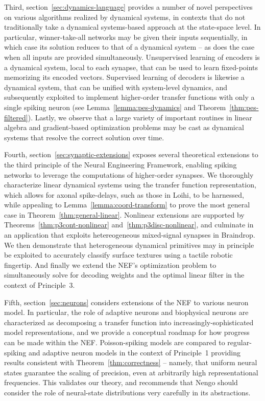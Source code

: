 Third, section~\ref{sec:dynamics-language} provides a number of novel perspectives on various algorithms realized by dynamical systems, in contexts that do not traditionally take a dynamical systems-based approach at the state-space level.
In particular, winner-take-all networks may be given their inputs sequentially, in which case its solution reduces to that of a dynamical system -- as does the case when all inputs are provided simultaneously.
Unsupervised learning of encoders is a dynamical system, local to each synapse, that can be used to learn fixed-points memorizing its encoded vectors. 
Supervised learning of decoders is likewise a dynamical system, that can be unified with system-level dynamics, and subsequently exploited to implement higher-order transfer functions with only a single spiking neuron (see Lemma~\ref{lemma:pes-dynamics} and Theorem~\ref{thm:pes-filtered}).
Lastly, we observe that a large variety of important routines in linear algebra and gradient-based optimization problems may be cast as dynamical systems that resolve the correct solution over time.

Fourth, section~\ref{sec:synaptic-extensions} exposes several theoretical extensions to the third principle of the Neural Engineering Framework, enabling spiking networks to leverage the computations of higher-order synapses.
We thoroughly characterize linear dynamical systems using the transfer function representation, which allows for axonal spike-delays, such as those in Loihi, to be harnessed, while appealing to Lemma~\ref{lemma:coord-transform} to prove the most general case in Theorem~\ref{thm:general-linear}.
Nonlinear extensions are supported by Theorems~\ref{thm:p3cont-nonlinear} and~\ref{thm:p3disc-nonlinear}, and culminate in an application that exploits hetereogeneous mixed-signal synapses in Braindrop.
We then demonstrate that heterogeneous dynamical primitives may in principle be exploited to accurately classify surface textures using a tactile robotic fingertip.
And finally we extend the NEF's optimization problem to simultaneously solve for decoding weights and the optimal linear filter in the context of Principle~3.

Fifth, section~\ref{sec:neurons} considers extensions of the NEF to various neuron model.
In particular, the role of adaptive neurons and biophysical neurons are characterized as decomposing a transfer function into increasingly-sophisticated model representations, and we provide a conceptual roadmap for how progress can be made within the NEF.
Poisson-spiking models are compared to regular-spiking and adaptive neuron models in the context of Principle~1 providing results consistent with Theorem~\ref{thm:correctness} -- namely, that uniform neural states guarantee the scaling of precision, even at arbitrarily high representational frequencies.
This validates our theory, and recommends that Nengo should consider the role of neural-state distributions very carefully in its abstractions.



